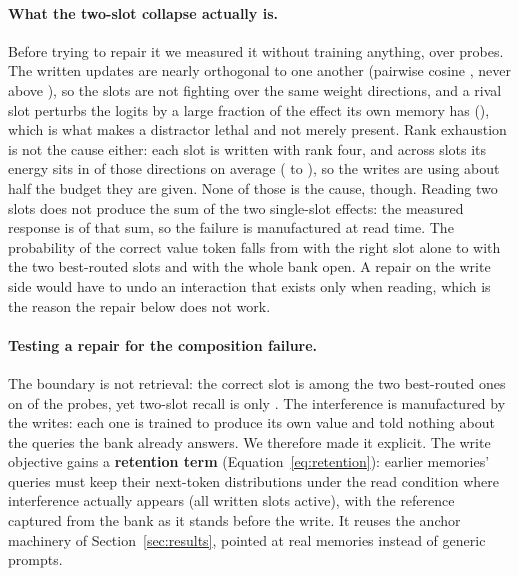 \documentclass[11pt]{article}
\begin{document}
\paragraph{What the two-slot collapse actually is.} Before trying to repair it we measured
it without training anything, over \tMechProbes{} probes. The written updates are nearly
orthogonal to one another (pairwise cosine \tMechUpdateCosine{}, never above
\tMechUpdateCosineMax{}), so the slots are not fighting over the same weight directions,
and a rival slot perturbs the logits by a large fraction of the effect its own memory has
(\tMechRivalOverOwn{}), which is what makes a distractor lethal and not merely
present. Rank exhaustion is not the cause either: each slot is written with rank four, and
across \tMechSlots{} slots its energy sits in \tMechStableRank{} of those directions on
average (\tMechStableRankMin{} to \tMechStableRankMax{}), so the writes are using about
half the budget they are given. None of those is the cause, though. Reading two slots
does not produce the sum
of the two single-slot effects: the measured response is \tMechResidual{} of that sum, so
the failure is manufactured at read time. The probability of the correct value token falls
from \tMechOwnProb{} with the right slot alone to \tMechTopTwoProb{} with the two
best-routed slots and \tMechAllProb{} with the whole bank open. A repair on the write side
would have to undo an interaction that exists only when reading, which is the reason the
repair below does not work.

\paragraph{Testing a repair for the composition failure.} The boundary is not
retrieval: the correct slot is among the two best-routed ones on
\tRetentionRouteTwo{} of the probes, yet two-slot recall is only
\tRetentionTopTwoBase{}. The interference is manufactured by the writes: each one is trained to produce its own value and told nothing about the queries the bank already answers. We therefore made it explicit. The write objective gains a
\textbf{retention term} (Equation~\ref{eq:retention}): earlier memories' queries must
keep their next-token distributions under the read condition where interference
actually appears (all written slots active), with the reference captured from the
bank as it stands before the write. It reuses the anchor machinery of
Section~\ref{sec:results}, pointed at real memories instead of generic prompts.
\end{document}
